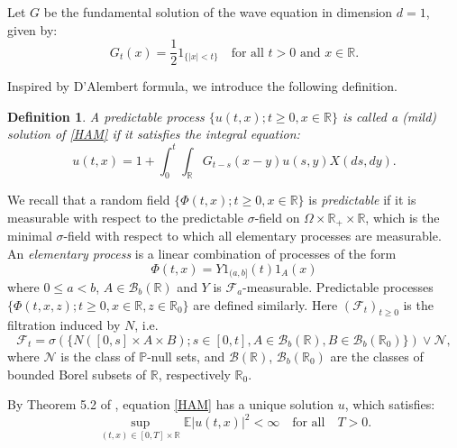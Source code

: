 \documentclass[12pt]{article}
\newtheorem{definition}[theorem]{Definition}
\def\cB{\mathcal{B}}
\def\cF{\mathcal{F}}
\def\cN{\mathcal{N}}
\def\bE{\mathbb{E}}
\def\bP{\mathbb{P}}
\def\bR{\mathbb{R}}
\begin{document}
Let $G$ be the fundamental solution of the wave equation in dimension $d=1$, given by:
\begin{equation}
\label{def-G}
G_t(x)=\frac{1}{2}1_{\{|x|<t\}} \quad \mbox{for all $t>0$ and $x \in \bR$.}
\end{equation}


Inspired by D'Alembert formula, we introduce the following definition. 

\begin{definition}
{\rm A predictable process $\{u(t,x);t\geq 0,x\in \bR\}$ is called a {\em (mild) solution} of \eqref{HAM}
if it satisfies the integral equation:
\begin{equation}
\label{def-sol}
u(t,x)=1+\int_0^t \int_{\bR}G_{t-s}(x-y)u(s,y)X(ds,dy).
\end{equation}
}
\end{definition}



We recall that a random field $\{\Phi(t,x);t\geq 0,x\in \bR\}$ is {\em predictable} if it is measurable with respect to the predictable $\sigma$-field on $\Omega \times \bR_{+} \times \bR$, which is the minimal $\sigma$-field with respect to which all elementary processes are measurable. An {\em elementary process} is a linear combination of processes of the form
\[
\Phi(t,x)=Y 1_{(a,b]}(t) 1_{A}(x)
\]
where  $0\leq a<b$, $A \in \cB_b(\bR)$ and $Y$ is $\cF_a$-measurable. Predictable processes 
$\{\Phi(t,x,z);t\geq 0,x\in \bR,z\in \bR_0\}$ are defined similarly. Here $(\cF_t)_{t\geq 0}$ is the filtration induced by $N$, i.e.
\[
\cF_t=\sigma(\{N([0,s] \times A \times B); s \in [0,t],A\in \cB_b(\bR), B \in \cB_b(\bR_0)\}) \vee \cN,
\]
where $\cN$ is the class of $\bP$-null sets, and $\cB(\bR)$, $\cB_b(\bR_0)$ are the classes of bounded Borel subsets of $\bR$, respectively $\bR_0$.

\medskip

By Theorem 5.2 of \cite{BJ25}, equation \eqref{HAM} has a unique solution $u$, which satisfies:
\[
\sup_{(t,x)\in [0,T] \times \bR}\bE|u(t,x)|^2<\infty \quad \mbox{for all} \quad T>0.
\]
\end{document}
